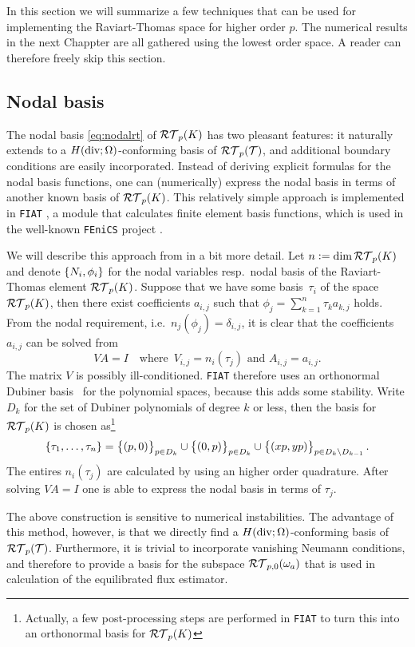 \documentclass[thesis.tex]{subfiles}
\begin{document}
  In this section we will summarize a few techniques that can be used for implementing the Raviart-Thomas space for higher order $p$.
  The numerical results in the next Chappter are all gathered using the lowest order space. A reader can therefore freely skip this section.

  \subsection{Nodal basis}
  The nodal basis \eqref{eq:nodalrt} of $\mathcal{RT}_p(K)$ has two pleasant features: it
  naturally extends to a $H(\operatorname{div}; \Omega)$-conforming basis of $\mathcal{RT}_p(\mathcal{T})$, and additional boundary conditions are easily incorporated.
  Instead of deriving explicit formulas for the nodal basis functions, one can (numerically) express the nodal basis in terms
  of another known basis of $\mathcal{RT}_p(K)$. This relatively simple approach is implemented in \texttt{FIAT} \cite{kirby}, a module that 
  calculates finite element basis functions,  
  which is used in the well-known \texttt{FEniCS} project \cite{fenics}. 

  We will describe this approach from \cite{kirby} in a bit more detail. Let $n := \dim \mathcal{RT}_p(K)$ and denote $\set{N_i, \phi_i}$ for the nodal variables 
  resp.~nodal basis of the Raviart-Thomas element $\mathcal{RT}_p(K)$.
  Suppose that we have some basis~$\tau_i$ of the space~$\mathcal{RT}_p(K)$, then there exist coefficients $a_{i,j}$ such that
  $\phi_j = \sum_{k = 1}^n \tau_k a_{k,j}$ holds.
  From the nodal requirement, i.e.~$n_j(\phi_j) = \delta_{i,j}$, it is clear that the coefficients $a_{i,j}$ can be solved from
  \[
    VA = I \quad \text{where }\, V_{i,j} = n_i(\tau_j) \text{ and } A_{i,j} = a_{i,j}.
  \]
  The matrix $V$ is possibly ill-conditioned. \texttt{FIAT} therefore uses an orthonormal Dubiner basis~\cite{dubiner1991spectral} for the polynomial spaces,
  because this adds some stability. Write $D_k$ for the set of Dubiner polynomials of degree $k$ or less,
  then the basis for $\mathcal{RT}_p(K)$ is chosen as\footnote{Actually, a few post-processing steps are performed in \texttt{FIAT} to turn this into an orthonormal basis for $\mathcal{RT}_p(K)$}
  \[
    \set{\tau_1,\dots, \tau_n} = \set{(p,0)}_{p \in D_k} \cup \set{(0,p)}_{p \in D_k} \cup \set{(xp, yp)}_{p \in D_k \setminus D_{k-1}}.
  \]
  The entires $n_i(\tau_j)$ are calculated by using an higher order quadrature. After solving $VA = I$ one is 
  able to express the nodal basis in terms of $\tau_j$.

  The above construction is sensitive to numerical instabilities. The advantage of this method, however, is that
  we directly find a $H(\operatorname{div}; \Omega)$-conforming basis of $\mathcal{RT}_p(\mathcal{T})$. Furthermore, it is trivial to incorporate vanishing Neumann conditions,
  and therefore to provide a basis for the subspace $\mathcal{RT}_{p,0}(\omega_a)$ that
  is used in calculation of the equilibrated flux estimator.
\end{document}
